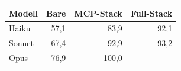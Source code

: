 \begin{tabular}{lrrr}
\toprule
Modell & Bare & MCP-Stack & Full-Stack \\
\midrule
Haiku & 57,1 & 83,9 & 92,1 \\
Sonnet & 67,4 & 92,9 & 93,2 \\
Opus & 76,9 & 100,0 & -- \\
\bottomrule
\end{tabular}

